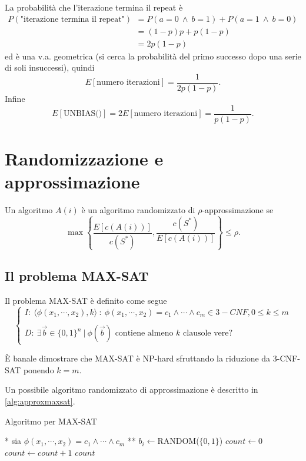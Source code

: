 La probabilità che l'iterazione termina il repeat è
\begin{align*}
P(\text{"iterazione termina il repeat"})&=P(a=0\ \land\ b=1) + P(a=1\ \land\ b=0) \\
&=(1-p)p + p(1-p) \\
&=2p(1-p)
\end{align*}
ed è una v.a. geometrica (si cerca la probabilità del primo successo dopo una serie di soli insuccessi), quindi
\[
E[\text{numero iterazioni}]=\frac{1}{2p(1-p)}.
\]
Infine
\[
E[\text{UNBIAS()}]=2E[\text{numero iterazioni}]=\frac{1}{p(1-p)}.
\]

\section{Randomizzazione e approssimazione}
Un algoritmo $A(i)$ è un algoritmo randomizzato di $\rho$-approssimazione se
\[
\max\left\lbrace\frac{E[c(A(i))]}{c(S^*)},\frac{c(S^*)}{E[c(A(i))]}\right\rbrace\leq\rho.
\]

\subsection{Il problema MAX-SAT}
Il problema MAX-SAT è definito come segue
\[
\begin{cases}
I:\ \langle \phi(x_1,\cdots,x_2),k\rangle\ :\  \phi(x_1,\cdots,x_2)=c_1 \land \cdots \land c_m \in 3-CNF, 0\leq k \leq m\\
\\
D:\ \exists\vec{b}\in\{0,1\}^n\ |\ \phi(\vec{b}) \text{ contiene almeno }k\text{ clausole vere?}
\end{cases}
\]

È banale dimostrare che MAX-SAT è NP-hard sfruttando la riduzione da 3-CNF-SAT ponendo $k=m$.

Un possibile algoritmo randomizzato di approssimazione è descritto in \ref{alg:approxmaxsat}.

\begin{algorithm}
\caption{Algoritmo per MAX-SAT}
\label{alg:approxmaxsat}
\begin{algorithmic}
	\State ** sia $ \phi(x_1,\cdots,x_2)=c_1 \land \cdots \land c_m $ **
		\State $b_i\gets$RANDOM($\{0,1\}$)
	\EndFor
	\State $count\gets 0$
			\State $count \gets count+1$
		\EndIf
	\EndFor
	\State \Return $count$
\EndFunction
\end{algorithmic}
\end{algorithm}

